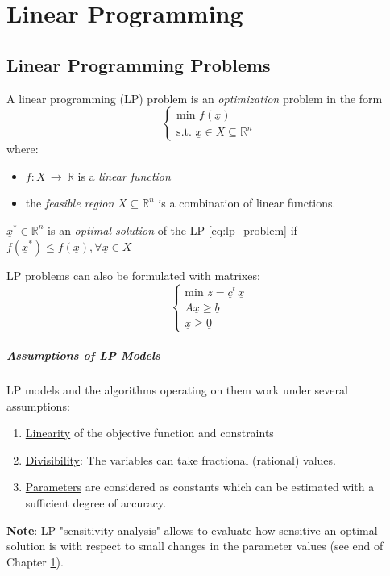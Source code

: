 \chapter{Linear Programming}\label{chap:lp}
    \section{Linear Programming Problems}
        A linear programming (LP) problem is an \textit{optimization} problem in the form
        \begin{equation}\label{eq:lp_problem}
            \begin{cases}
                \text{min } f(\underline{x})\\
                \text{s.t. } \underline{x} \in X \subseteq \mathbb{R}^n
            \end{cases}
        \end{equation}
        where:
        \begin{itemize}
            \item $f: X \,\rightarrow\, \mathbb{R}$ is a \textit{linear function}
            \item the \textit{feasible region} $X \subseteq \mathbb{R}^n$ is a combination of linear functions.
        \end{itemize}
        \begin{definition}
            $\underline{x}^* \in \mathbb{R}^n$ is an \emph{optimal solution} of the LP \eqref{eq:lp_problem} if $f(\underline{x}^*) \leq f(\underline{x}), \forall \underline{x} \in X$
        \end{definition}
        LP problems can also be formulated with matrixes:
        \begin{equation}
            \begin{cases}
                \text{min } z = \underline{c}^t\, \underline{x}\\
                A\underline{x} \geq \underline{b}\\
                \underline{x} \geq \underline{0}
            \end{cases}
        \end{equation}

        \paragraph{Assumptions of LP Models}
            LP models and the algorithms operating on them work under several assumptions:
            \begin{enumerate}
                \item \underline{Linearity} of the objective function and constraints
                \item \underline{Divisibility}: The variables can take fractional (rational) values.
                \item \underline{Parameters} are considered as constants which can be estimated with a sufficient degree of accuracy.
            \end{enumerate}
        \textbf{Note}: LP "sensitivity analysis" allows to evaluate how sensitive an optimal solution is
        with respect to small changes in the parameter values (see end of Chapter \ref{chap:lp}).
